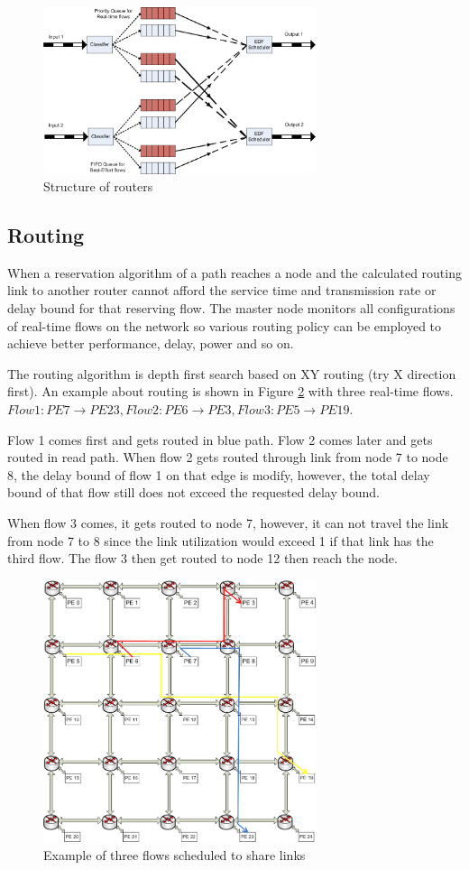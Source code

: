 \documentclass[conference, twocolumn]{IEEEtran}
\theoremstyle{definition}
\begin{document}
\begin{figure}[htp]
\centering
\includegraphics[width=8cm]{pics/Router.png}
\caption[Other Spec.]
{Structure of routers}\label{fig:RouterStructure}
\end{figure}

\subsection{Routing}
When a reservation algorithm of a path reaches a node and the calculated routing
link to another router cannot afford the service time and transmission rate or delay 
bound for that reserving flow. The master node monitors all configurations of
real-time flows on the network so various routing policy can be employed to
achieve better performance, delay, power and so on.

The routing algorithm is depth first search based on XY routing (try X
direction first). An example about routing is shown in Figure
\ref{fig:3FlowsEx} with three real-time flows. $Flow 1: PE7 \rightarrow
PE23, Flow 2: PE6 \rightarrow PE3, Flow 3: PE5 \rightarrow PE19$.

Flow 1 comes first and gets routed in blue path. Flow 2 comes later and gets
routed in read path.  When flow 2 gets routed through link from node 7 to node
8, the delay bound of flow 1 on that edge is modify, however, the total delay
bound of that flow still does not exceed the requested delay bound.

When flow 3 comes, it gets routed to node 7, however, it can not travel the
link from node 7 to 8 since the link utilization would exceed 1 if that link
has the third flow. The flow 3 then get routed to node 12 then reach the node.

\begin{figure}[htp]
\centering
\includegraphics[width=8cm]{pics/Example.png}
\caption[Three flows example.]
{Example of three flows scheduled to share links}\label{fig:3FlowsEx}
\end{figure}
\end{document}
